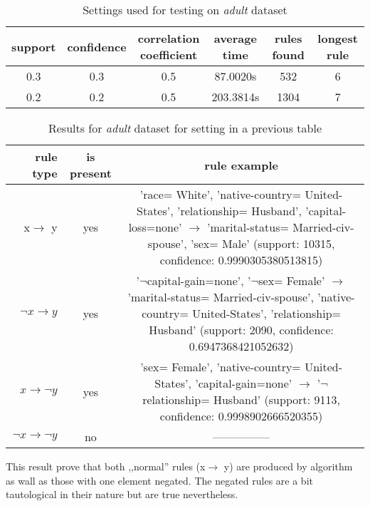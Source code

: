 \documentclass{article}
\begin{document}
	\begin{table}[H]
		\centering
		\caption{Settings used for testing on \textit{adult} dataset}
		\label{as}
		\begin{tabular}{c |c |c|c|c|c}
			support&confidence&\makecell{correlation\\coefficient}&average time&rules found&longest rule\\
			\hline
			\hline
			0.3&0.3&0.5&87.0020s&532&6\\
			\hline
			0.2&0.2&0.5&203.3814s&1304&7\\
		\end{tabular}
	\end{table}
	\begin{table}[H]
		\centering
		\caption{Results for \textit{adult} dataset for setting in a previous table}
		\label{ar}
		\begin{tabular}{r|c |c}
			rule type& is present & rule example\\
			\hline
			\hline
			x$\rightarrow$ y & yes & \makecell{'race= White', 'native-country= United-States',\\ 'relationship= Husband', 'capital-loss=none' $\rightarrow$\\ 'marital-status= Married-civ-spouse', 'sex= Male'\\ (support: 10315, confidence: 0.9990305380513815)}\\
			\hline
			$\neg x\rightarrow y$ & yes &\makecell{'$\neg$capital-gain=none', '$\neg$sex= Female' $\rightarrow$\\ 'marital-status= Married-civ-spouse',\\ 'native-country= United-States', 'relationship= Husband'\\ (support: 2090, confidence: 0.6947368421052632)}\\
			\hline
			$x\rightarrow \neg y $& yes &\makecell{'sex= Female', 'native-country= United-States',\\ 'capital-gain=none' $\rightarrow$\\ '$\neg$relationship= Husband'\\ (support: 9113, confidence: 0.9998902666520355)}\\
			\hline
			$\neg x\rightarrow \neg y $& no &---------------\\ 
		\end{tabular}
	\end{table}
	
	This result prove that both ,,normal'' rules  (x$\rightarrow$ y) are produced by algorithm as wall as those with one element negated. The negated rules are a bit tautological in their nature but are true nevertheless.
	
\end{document}
